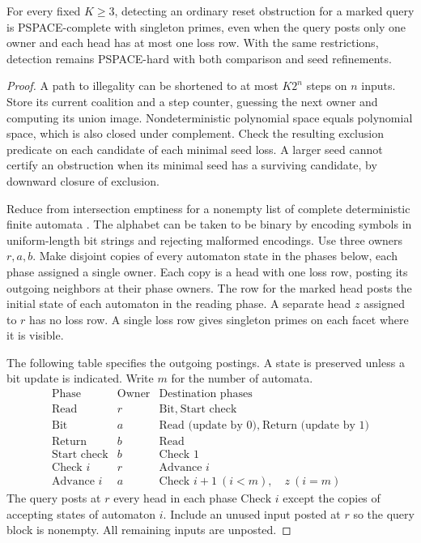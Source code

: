 \begin{theorem}
\label{core:thm:singleton-reset-pspace}
For every fixed $K\ge3$, detecting an ordinary reset
obstruction for a marked query is PSPACE-complete with
singleton primes, even when the query posts only one owner
and each head has at most one loss row.
With the same restrictions, detection remains
PSPACE-hard with both comparison and seed refinements.
\end{theorem}
\begin{proof}
A path to illegality can be shortened to at most $K2^n$
steps on $n$ inputs. Store its current coalition and a
step counter, guessing the next owner and computing its
union image. Nondeterministic polynomial space equals
polynomial space, which is also closed under complement.
Check the resulting exclusion predicate on each candidate
of each minimal seed loss. A larger seed cannot certify
an obstruction when its minimal seed has a surviving
candidate, by downward closure of exclusion.

Reduce from intersection emptiness for a nonempty list
of complete deterministic finite automata
\cite{Kozen1977}. The alphabet can be taken to be binary
by encoding symbols in uniform-length bit strings and
rejecting malformed encodings. Use three owners $r,a,b$.
Make disjoint copies of every automaton state in the
phases below, each phase assigned a single owner.
Each copy is a head with one loss row, posting its
outgoing neighbors at their phase owners. The row for
the marked head posts the initial state of each automaton
in the reading phase. A separate head $z$ assigned to
$r$ has no loss row. A single loss row gives singleton
primes on each facet where it is visible.

The following table specifies the outgoing postings.
A state is preserved unless a bit update is indicated.
Write $m$ for the number of automata.
\[
\begin{array}{lll}
\text{Phase} & \text{Owner} & \text{Destination phases}\\
\hline
\text{Read} & r & \text{Bit},\ \text{Start check}\\
\text{Bit} & a & \text{Read (update by 0)},\ \text{Return (update by 1)}\\
\text{Return} & b & \text{Read}\\
\text{Start check} & b & \text{Check }1\\
\text{Check }i & r & \text{Advance }i\\
\text{Advance }i & a & \text{Check }i+1\ (i<m),\quad z\ (i=m)
\end{array}
\]
The query posts at $r$ every head in each phase
$\text{Check }i$ except the copies of accepting states
of automaton $i$. Include an unused input posted at $r$
so the query block is nonempty. All remaining inputs
are unposted.


\end{proof}
